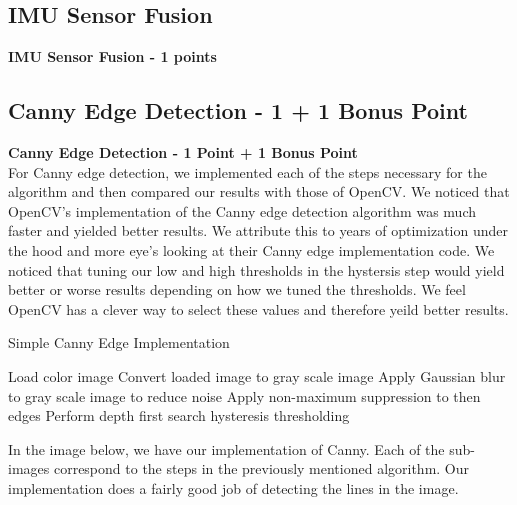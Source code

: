 \documentclass{article}
\numberwithin{equation}{section} %
\numberwithin{figure}{section} %
\numberwithin{table}{section} %
\begin{document}
\begin{framed}
\subsection{IMU Sensor Fusion}
\label{sec:SensorFusion}
\textbf{IMU Sensor Fusion - 1 points} \\
\end{framed}


\begin{framed}
\subsection{Canny Edge Detection - 1 + 1 Bonus Point}
\label{sec:CannyEdge}
\textbf{ Canny Edge Detection - 1 Point + 1 Bonus Point} \\
For Canny edge detection, we implemented each of the steps necessary for the algorithm and then compared our results with those of OpenCV.  We noticed that OpenCV's implementation of the Canny edge detection algorithm was much faster and yielded better results.  We attribute this to years of optimization under the hood and more eye's looking at their Canny edge implementation code.  We noticed that tuning our low and high thresholds in the hystersis step would yield better or worse results depending on how we tuned the thresholds. We feel OpenCV has a clever way to select these values and therefore yeild better results.

\begin{algorithm}[H]
\caption{Simple Canny Edge Implementation}\label{alg:cap}
\begin{algorithmic}[1] %
\State Load color image 
\State Convert loaded image to gray scale image
\State Apply Gaussian blur to gray scale image to reduce noise
\State Apply non-maximum suppression to then edges
\State Perform depth first search hysteresis thresholding
\end{algorithmic}
\end{algorithm}

In the image below, we have our implementation of Canny.  Each of the sub-images correspond to the steps in the previously mentioned algorithm. Our implementation does a fairly good job of detecting the lines in the image.   


\end{framed}
\end{document}
